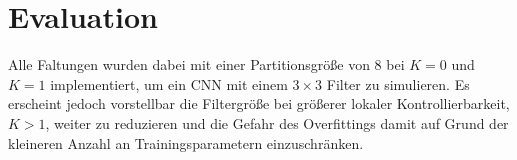 \chapter{Evaluation}
\label{evaluation}





Alle Faltungen wurden dabei mit einer Partitionsgröße von $8$ bei $K=0$ und $K=1$ implementiert, um ein \gls{CNN} mit einem $3 \times 3$ Filter zu simulieren.
Es erscheint jedoch vorstellbar die Filtergröße bei größerer lokaler Kontrollierbarkeit, \dhe{} $K > 1$, weiter zu reduzieren und die Gefahr des Overfittings damit auf Grund der kleineren Anzahl an Trainingsparametern einzuschränken.



